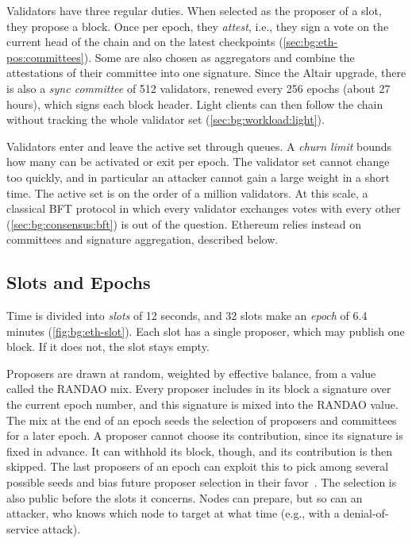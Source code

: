 Validators have three regular duties.
When selected as the proposer of a slot, they propose a block.
Once per epoch, they \emph{attest}, i.e., they sign a vote on the current head of the chain and on the latest checkpoints (\autoref{sec:bg:eth-pos:committees}).
Some are also chosen as aggregators and combine the attestations of their committee into one signature.
Since the Altair upgrade, there is also a \emph{sync committee} of 512 validators, renewed every 256 epochs (about 27 hours), which signs each block header.
Light clients can then follow the chain without tracking the whole validator set (\autoref{sec:bg:workload:light}).

Validators enter and leave the active set through queues.
A \emph{churn limit} bounds how many can be activated or exit per epoch.
The validator set cannot change too quickly, and in particular an attacker cannot gain a large weight in a short time.
The active set is on the order of a million validators. 
At this scale, a classical BFT protocol in which every validator exchanges votes with every other (\autoref{sec:bg:consensus:bft}) is out of the question.
Ethereum relies instead on committees and signature aggregation, described below.

\subsection{Slots and Epochs}\label{sec:bg:eth-pos:slots}

Time is divided into \emph{slots} of 12 seconds, and 32 slots make an \emph{epoch} of 6.4 minutes (\autoref{fig:bg:eth-slot}).
Each slot has a single proposer, which may publish one block.
If it does not, the slot stays empty.

Proposers are drawn at random, weighted by effective balance, from a value called the RANDAO mix.
Every proposer includes in its block a signature over the current epoch number, and this signature is mixed into the RANDAO value.
The mix at the end of an epoch seeds the selection of proposers and committees for a later epoch.
A proposer cannot choose its contribution, since its signature is fixed in advance.
It can withhold its block, though, and its contribution is then skipped.
The last proposers of an epoch can exploit this to pick among several possible seeds and bias future proposer selection in their favor~\cite{nagy2025forking}.
The selection is also public before the slots it concerns.
Nodes can prepare, but so can an attacker, who knows which node to target at what time (e.g., with a denial-of-service attack).

